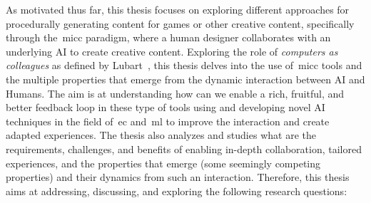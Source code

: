 As motivated thus far, this thesis focuses on exploring different approaches for procedurally generating content for games or other creative content, specifically through the~\acrshort{micc} paradigm, where a human designer collaborates with an underlying AI to create creative content. Exploring the role of \emph{computers as colleagues} as defined by Lubart~\cite{LUBART2005-computerPartners}, this thesis delves into the use of~\acrshort{micc} tools and the multiple properties that emerge from the dynamic interaction between AI and Humans. The aim is at understanding how can we enable a rich, fruitful, and better feedback loop in these type of tools using and developing novel AI techniques in the field of~\acrlong{ec} and~\acrlong{ml} to improve the interaction and create adapted experiences. The thesis also analyzes and studies what are the requirements, challenges, and benefits of enabling in-depth collaboration, tailored experiences, and the properties that emerge (some seemingly competing properties) and their dynamics from such an interaction. Therefore, this thesis aims at addressing, discussing, and exploring the following research questions: 









